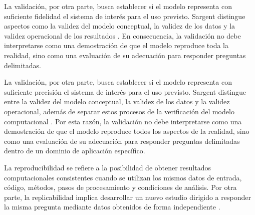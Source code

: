 La validación, por otra parte, busca establecer si el modelo representa con suficiente fidelidad el sistema de interés para el uso previsto. Sargent distingue aspectos como la validez del modelo conceptual, la validez de los datos y la validez operacional de los resultados \cite{sargent2003verification}. En consecuencia, la validación no debe interpretarse como una demostración de que el modelo reproduce toda la realidad, sino como una evaluación de su adecuación para responder preguntas delimitadas. 

La validación, por otra parte, busca establecer si el modelo representa con suficiente precisión el sistema de interés para el uso previsto. Sargent distingue entre la validez del modelo conceptual, la validez de los datos y la validez operacional, además de separar estos procesos de la verificación del modelo computacional \cite{sargent2003verification}. Por esta razón, la validación no debe interpretarse como una demostración de que el modelo reproduce todos los aspectos de la realidad, sino como una evaluación de su adecuación para responder preguntas delimitadas dentro de un dominio de aplicación específico.

La reproducibilidad se refiere a la posibilidad de obtener resultados computacionales consistentes cuando se utilizan los mismos datos de entrada, código, métodos, pasos de procesamiento y condiciones de análisis. Por otra parte, la replicabilidad implica desarrollar un nuevo estudio dirigido a responder la misma pregunta mediante datos obtenidos de forma independiente \cite{nasem2019reproducibility}. 

